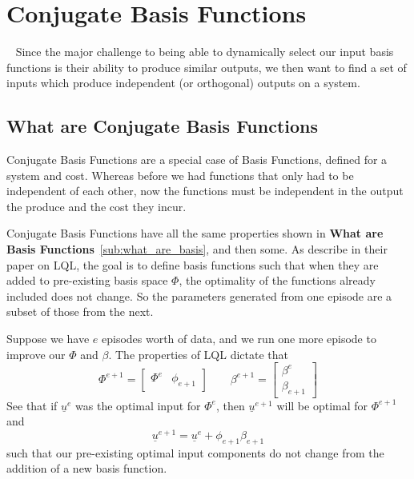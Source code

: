 
\FloatBarrier\section{Conjugate Basis Functions}
~\label{sec:conjugate_basis_functions}
Since the major challenge to being able to dynamically select our input basis functions is their ability to produce similar outputs, we then want to find a set of inputs which produce independent (or orthogonal) outputs on a system. 

\FloatBarrier\subsection{What are Conjugate Basis Functions}
Conjugate Basis Functions are a special case of Basis Functions, defined for a system and cost. Whereas before we had functions that only had to be independent of each other, now the functions must be independent in the output the produce and the cost they incur. 

Conjugate Basis Functions have all the same properties shown in \textbf{What are Basis Functions}~\ref{sub:what_are_basis}, and then some. As \cite{FruehPhan1998} describe in their paper on \ac{LQL}, the goal is to define basis functions such that when they are added to pre-existing basis space $\Phi$, the optimality of the functions already included does not change. So the parameters generated from one episode are a subset of those from the next.

Suppose we have $e$ episodes worth of data, and we run one more episode to improve our $\Phi$ and $\beta$. The properties of LQL dictate that
\begin{equation}
    \Phi^{e+1} = \begin{bmatrix}
        \Phi^e & \phi_{e+1}
    \end{bmatrix}
    \quad\quad
    \beta^{e+1} = \begin{bmatrix}
        \beta^e \\ \beta_{e+1}
    \end{bmatrix}
    \label{eq:conjugate_subspace}
\end{equation}
See that if $\underline{u}^e$ was the optimal input for $\Phi^e$, then $\underline{u}^{e+1}$ will be optimal for $\Phi^{e+1}$ and
\begin{equation}
    \underline{u}^{e+1} = \underline{u}^e + \phi_{e+1}\beta_{e+1}
\end{equation}
such that our pre-existing optimal input components do not change from the addition of a new basis function. 

